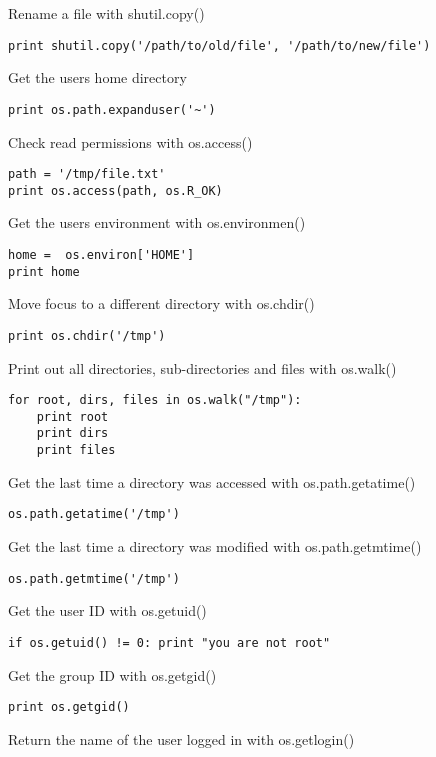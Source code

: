 \documentclass[justified,sixbynine]{tufte-book}
\theoremstyle{plain}%
\theoremstyle{definition}
\theoremstyle{remark}
\begin{document}
\begin{fullwidth}
Rename a file with shutil.copy()

\begin{lstlisting}
print shutil.copy('/path/to/old/file', '/path/to/new/file')
\end{lstlisting}

Get the users home directory

\begin{lstlisting}
print os.path.expanduser('~')
\end{lstlisting}

Check read permissions with os.access()

\begin{lstlisting}
path = '/tmp/file.txt'
print os.access(path, os.R_OK)
\end{lstlisting}

Get the users environment with os.environmen()

\begin{lstlisting}
home =  os.environ['HOME']
print home
\end{lstlisting}

Move focus to a different directory with os.chdir()

\begin{lstlisting}
print os.chdir('/tmp')
\end{lstlisting}

Print out all directories, sub-directories and files with os.walk()

\begin{lstlisting}
for root, dirs, files in os.walk("/tmp"):
    print root
    print dirs
    print files
\end{lstlisting}

Get the last time a directory was accessed with os.path.getatime()

\begin{lstlisting}
os.path.getatime('/tmp')
\end{lstlisting}
Get the last time a directory was modified with os.path.getmtime()

\begin{lstlisting}
os.path.getmtime('/tmp')
\end{lstlisting}
Get the user ID with os.getuid()
\begin{lstlisting}
if os.getuid() != 0: print "you are not root"
\end{lstlisting}
Get the group ID with os.getgid()

\begin{lstlisting}
print os.getgid()
\end{lstlisting}
Return the name of the user logged in with os.getlogin()


\end{fullwidth}
\end{document}
